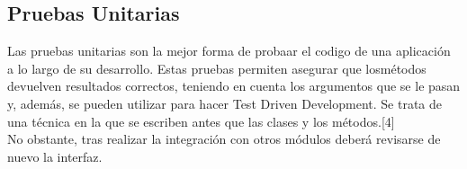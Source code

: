 \subsection{Pruebas Unitarias}
	\par Las pruebas unitarias son la mejor forma de probaar el codigo de una aplicación a lo largo de su desarrollo. Estas pruebas permiten asegurar que losmétodos devuelven resultados correctos, teniendo en cuenta los argumentos que se le pasan y, además, se pueden utilizar para hacer Test Driven Development. Se trata de una técnica en la que se escriben antes que las clases y los métodos.[4]\\
 No obstante, tras realizar la integración con otros módulos deberá revisarse de nuevo la interfaz.